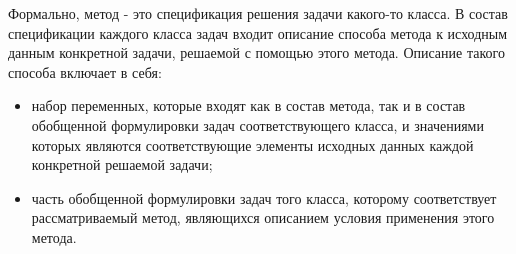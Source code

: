\begin{SCn}
\end{SCn}

Формально, метод - это спецификация решения задачи какого-то класса. В состав спецификации каждого класса задач входит
описание способа  метода к исходным данным конкретной задачи, решаемой с помощью этого метода. Описание
такого способа  включает в себя:
\begin{itemize}
    \item набор переменных, которые входят как в состав метода, так и в состав обобщенной формулировки задач
    соответствующего класса, и значениями которых являются соответствующие элементы исходных данных каждой конкретной
    решаемой задачи;
    \item часть обобщенной формулировки задач того класса, которому соответствует рассматриваемый метод, являющихся
    описанием условия применения этого метода.
\end{itemize}


